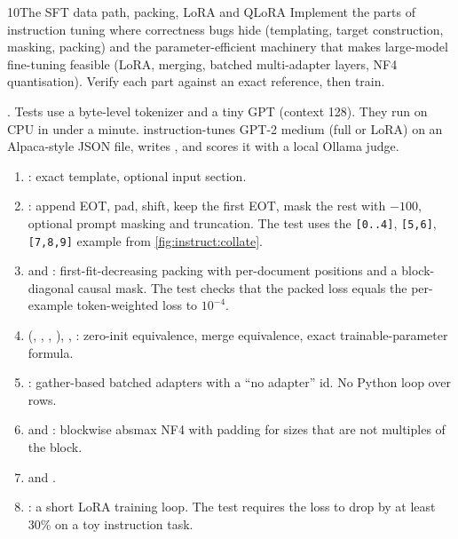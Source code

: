 \begin{labbox}{10}{The SFT data path, packing, LoRA and QLoRA}
Implement the parts of instruction tuning where correctness bugs hide (templating,
target construction, masking, packing) and the parameter-efficient machinery that
makes large-model fine-tuning feasible (LoRA, merging, batched multi-adapter layers,
NF4 quantisation). Verify each part against an exact reference, then train.

.
Tests use a byte-level tokenizer and a tiny GPT (context 128). They run on CPU in under
a minute.  instruction-tunes GPT-2 medium (full or LoRA) on an Alpaca-style
JSON file, writes , and scores it with a local Ollama judge.

\begin{enumerate}
\item {}: exact template, optional input section.
\item {}: append EOT, pad, shift, keep the first EOT, mask the
rest with $-100$, optional prompt masking and truncation. The test uses the
\texttt{[0..4]}, \texttt{[5,6]}, \texttt{[7,8,9]} example from
\cref{fig:instruct:collate}.
\item {} and : first-fit-decreasing packing with
per-document positions and a block-diagonal causal mask. The test checks that the
packed loss equals the per-example token-weighted loss to $10^{-4}$.
\item {} (, , ,
), , : zero-init equivalence,
merge equivalence, exact trainable-parameter formula.
\item {}: gather-based batched adapters with a ``no adapter''
id. No Python loop over rows.
\item {} and : blockwise absmax NF4 with padding
for sizes that are not multiples of the block.
\item {} and .
\item {}: a short LoRA training loop. The test requires the loss to drop by
at least 30\% on a toy instruction task.
\end{enumerate}


\end{labbox}

